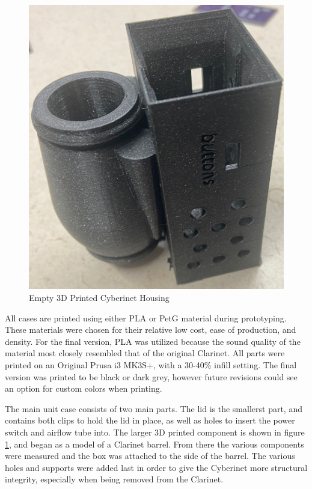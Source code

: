 \begin{center}
    \begin{figure}
        \centering
        \includegraphics[scale=0.1]{diagrams/builtUnits/emptyCase.JPG}
        \caption{Empty 3D Printed Cyberinet Housing}
        \label{fig:cybernetCase}
    \end{figure}
\end{center}

All cases are printed using either PLA or PetG material during prototyping. These materials were chosen for their relative low cost, ease of production, and density. For the final version, PLA was utilized because the sound quality of the material most closely resembled that of the original Clarinet. All parts were printed on an Original Prusa i3 MK3S+, with a 30-40\% infill setting. The final version was printed to be black or dark grey, however future revisions could see an option for custom colors when printing.

The main unit case consists of two main parts. The lid is the smallerst part, and contains both clips to hold the lid in place, as well as holes to insert the power switch and airflow tube into. The larger 3D printed component is shown in figure \ref{fig:cybernetCase}, and began as a model of a Clarinet barrel. From there the various components were measured and the box was attached to the side of the barrel. The various holes and supports were added last in order to give the Cyberinet more structural integrity, especially when being removed from the Clarinet.


